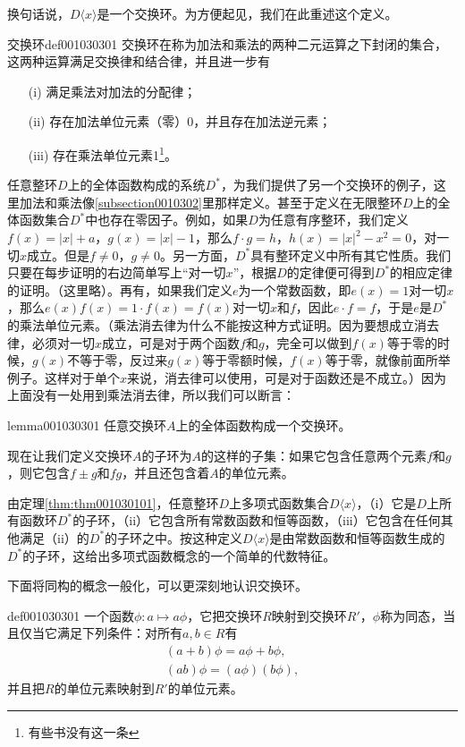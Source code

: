 换句话说，$D\langle{}x\rangle$是一个交换环。为方便起见，我们在此重述这个定义。
\begin{definition}{交换环}{def001030301}
交换环在称为加法和乘法的两种二元运算之下封闭的集合，这两种运算满足交换律和结合律，并且进一步有
\begin{enumerate}
\item[(i)] 满足乘法对加法的分配律；
\item[(ii)] 存在加法单位元素（零）0，并且存在加法逆元素；
\item[(iii)] 存在乘法单位元素1\footnote{有些书没有这一条}。
\end{enumerate}
\end{definition}

任意整环$D$上的全体函数构成的系统$D^*$，为我们提供了另一个交换环的例子，这里加法和乘法像\ref{subsection0010302}里那样定义。甚至于定义在无限整环$D$上的全体函数集合$D^*$中也存在零因子。例如，如果$D$为任意有序整环，我们定义$f(x)=|x|+a$，$g(x)=|x|-1$，那么$f\cdot{}g=h$，$h(x)=|x|^2-x^2=0$，对一切$x$成立。但是$f \neq 0$，$g \neq 0$。另一方面，$D^*$具有整环定义中所有其它性质。我们只要在每步证明的右边简单写上“对一切$x$”，根据$D$的定律便可得到$D^*$的相应定律的证明。（这里略）。再有，如果我们定义$e$为一个常数函数，即$e(x)=1$对一切$x$，那么$e(x)f(x)=1\cdot{}f(x)=f(x)$对一切$x$和$f$，因此$e \cdot f = f$，于是$e$是$D^*$的乘法单位元素。（乘法消去律为什么不能按这种方式证明。因为要想成立消去律，必须对一切$x$成立，可是对于两个函数$f$和$g$，完全可以做到$f(x)$等于零的时候，$g(x)$不等于零，反过来$g(x)$等于零额时候，$f(x)$等于零，就像前面所举例子。这样对于单个$x$来说，消去律可以使用，可是对于函数还是不成立。）因为上面没有一处用到乘法消去律，所以我们可以断言：
\begin{lemma}{}{lemma001030301}
任意交换环$A$上的全体函数构成一个交换环。
\end{lemma}

现在让我们定义交换环$A$的子环为$A$的这样的子集：如果它包含任意两个元素$f$和$g$，则它包含$f \pm g$和$fg$，并且还包含着$A$的单位元素。

由定理\ref{thm:thm001030101}，任意整环$D$上多项式函数集合$D\langle{}x\rangle$，（i）它是$D$上所有函数环$D^*$的子环，（ii）它包含所有常数函数和恒等函数，（iii）它包含在任何其他满足（ii）的$D^*$的子环之中。按这种定义$D\langle{}x\rangle$是由常数函数和恒等函数生成的$D^*$的子环，这给出多项式函数概念的一个简单的代数特征。

下面将同构的概念一般化，可以更深刻地认识交换环。
\begin{definition}{}{def001030301}
一个函数$\phi: a \mapsto a\phi$，它把交换环$R$映射到交换环$R'$，$\phi$称为同态，当且仅当它满足下列条件：对所有$a, b \in R$有
\begin{gather}
(a+b)\phi = a\phi + b\phi, \label{equ001030301}\\
(ab)\phi = (a\phi)(b\phi),\label{equ001030302}
\end{gather}
并且把$R$的单位元素映射到$R'$的单位元素。
\end{definition}

